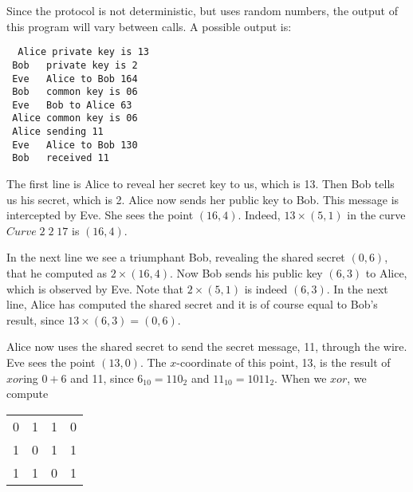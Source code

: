 \documentclass[tikz]{scrreprt}
\newcommand{\Conid}[1]{\mathit{#1}}
\begin{document}
Since the protocol is not deterministic,
but uses random numbers, the output of this program
will vary between calls.
A possible output is:

\begin{tabbing}\tt
~Alice~private~key~is~13\\
\tt ~Bob~~~private~key~is~2\\
\tt ~Eve~~~Alice~to~Bob~164\\
\tt ~Bob~~~common~key~is~06\\
\tt ~Eve~~~Bob~to~Alice~63\\
\tt ~Alice~common~key~is~06\\
\tt ~Alice~sending~11\\
\tt ~Eve~~~Alice~to~Bob~130\\
\tt ~Bob~~~received~11
\end{tabbing}

The first line is Alice to reveal her secret key to us,
which is 13. Then Bob tells us his secret, which is 2.
Alice now sends her public key to Bob. This message
is intercepted by Eve. She sees the point $(16,4)$.
Indeed, $13\times (5,1)$ in the curve \ensuremath{\Conid{Curve}\;\mathrm{2}\;\mathrm{2}\;\mathrm{17}} is
$(16,4)$.

In the next line we see a triumphant Bob, revealing
the shared secret $(0,6)$, that he computed as 
$2\times (16,4)$. Now Bob sends his public key $(6,3)$ to Alice,
which is observed by Eve. Note that $2\times (5,1)$ is indeed
$(6,3)$. In the next line, Alice has computed the shared secret
and it is of course equal to Bob's result, 
since $13\times (6,3) = (0,6)$.

Alice now uses the shared secret to send the secret message,
11, through the wire. Eve sees the point $(13,0)$.
The $x$-coordinate of this point, 13, is the result of
$xor$ing $0+6$ and 11, 
since $6_{10} = 110_2$ and 
$11_{10} = 1011_2$. When we $xor$, we compute

\begin{center}
\begin{tabular}{|c|c|c|c|}\hline
0 & 1 & 1 & 0\\
1 & 0 & 1 & 1\\\hline
1 & 1 & 0 & 1\\\hline
\end{tabular}
\end{center}
\end{document}
